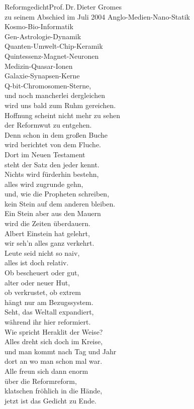 \begin{lied*}{Reformgedicht}{Prof.\,Dr.\,Dieter Gromes\\zu seinem Abschied im Juli 2004}
Anglo-Medien-Nano-Statik\\
Kosmo-Bio-Informatik\\
Gen-Astrologie-Dynamik\\
Quanten-Umwelt-Chip-Keramik\\
Quintessenz-Magnet-Neuronen\\
Medizin-Quasar-Ionen\\
Galaxie-Synapsen-Kerne\\
Q-bit-Chromosomen-Sterne,\\
und noch mancherlei dergleichen\\
wird uns bald zum Ruhm gereichen.\\

Hoffnung scheint nicht mehr zu sehen\\
der Reformwut zu entgehen.\\
Denn schon in dem großen Buche\\
wird berichtet von dem Fluche.\\
Dort im Neuen Testament\\
steht der Satz den jeder kennt.\\
Nichts wird fürderhin bestehn,\\
alles wird zugrunde gehn,\\
und, wie die Propheten schreiben,\\
kein Stein auf dem anderen bleiben.\\

Ein Stein aber aus den Mauern\\
wird die Zeiten überdauern.\\
Albert Einstein hat gelehrt,\\
wir seh'n alles ganz verkehrt.\\
Leute seid nicht so naiv,\\
alles ist doch relativ.\\
Ob bescheuert oder gut,\\
alter oder neuer Hut,\\
ob verkrustet, ob extrem\\
hängt nur am Bezugssystem.\\

Seht, das Weltall expandiert,\\
während ihr hier reformiert.\\
Wie spricht Heraklit der Weise?\\
\glqq Alles dreht sich doch im Kreise,\\
und man kommt nach Tag und Jahr\\
dort an wo man schon mal war.\grqq\\

Alle freun sich dann enorm\\
über die Reformreform,\\
klatschen fröhlich in die Hände,\\
jetzt ist das Gedicht zu Ende.\\
\end{lied*}

